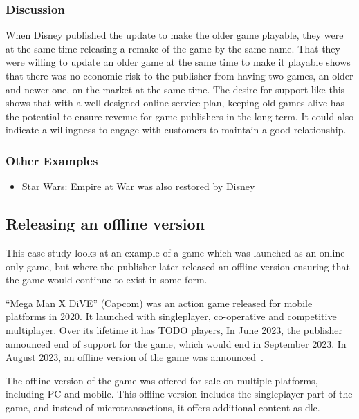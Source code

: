 \subsubsection*{Discussion}
When Disney published the update to make the older game playable, they were at the same time releasing a remake of the game by the same name.
That they were willing to update an older game at the same time to make it playable shows that there was no economic risk to the publisher from having two games, an older and newer one, on the market at the same time.
The desire for support like this shows that with a well designed online service plan, keeping old games alive has the potential to ensure revenue for game publishers in the long term.
It could also indicate a willingness to engage with customers to maintain a good relationship.

\subsubsection*{Other Examples}
\begin{itemize}
    \item Star Wars: Empire at War was also restored by Disney\cite{disney-sweaw-2017}
\end{itemize}

\subsection{Releasing an offline version}
This case study looks at an example of a game which was launched as an online only game,
but where the publisher later released an offline version ensuring that the game would continue to exist in some form.

``Mega Man X DiVE'' (Capcom) was an action game released for mobile platforms in 2020.
It launched with singleplayer, co-operative and competitive multiplayer.
Over its lifetime it has TODO players\cn,
In June 2023, the publisher announced end of support for the game, which would end in September 2023\cite{megaman-eos-2023}.
In August 2023, an offline version of the game was announced~\cite{megaman-offline}.

The offline version of the game was offered for sale on multiple platforms, including PC and mobile.
This offline version includes the singleplayer part of the game, and instead of microtransactions, it offers additional content as \gls{dlc}.

